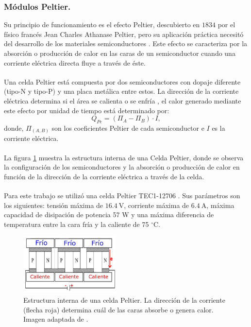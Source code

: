 \subsubsection{Módulos Peltier.}
Su principio de funcionamiento es el efecto Peltier, descubierto en $1834$ por el físico francés Jean Charles Athanase Peltier, pero su aplicación práctica necesitó del desarrollo de los materiales semiconductores \citep{Sandoval2007}. Este efecto se caracteriza por la absorción o producción de calor en las caras de un semiconductor cuando una corriente eléctrica directa fluye a través de éste. \\ \\
Una celda Peltier está compuesta por  dos semiconductores con dopaje diferente (tipo-N y tipo-P) y una placa metálica entre estos. La dirección de la corriente eléctrica determina si el área se calienta o se enfría \citep{peltier_theory}, el calor generado mediante este efecto por unidad de tiempo está determinado por:
\begin{equation}
Q_{Pe}=(\Pi_{A}-\Pi_{B})\cdot I,
\label{peltier_eq}
\end{equation}
donde, $\Pi_{(A,B)}$ son los coeficientes Peltier de cada semiconductor e $I$ es la corriente eléctrica.\\ \\
La figura \ref{fig:celda} muestra la estructura interna de una Celda Peltier, donde se observa la configuración de los semiconductores y la absorción o producción de calor en función de la dirección de la corriente eléctrica a través de la celda.\\ \\
Para este trabajo se utilizó una celda Peltier TEC1-12706 \citep{datasheet_Peltier}. Sus parámetros son los siguientes: tensión máxima de $16.4~\mbox{V}$, corriente máxima de $6.4~\mbox{A}$, máxima capacidad de disipación de potencia 57 W y una máxima diferencia de temperatura entre la cara fría y la caliente de 75 $^\circ \mbox{C}$.

\begin{figure}[h!]
\begin{centering}
  \includegraphics[width=0.45\textwidth]{Images/celda.JPG}
    \caption{Estructura interna de una celda Peltier. La dirección de la corriente (flecha roja) determina cuál de las caras absorbe o genera calor. Imagen adaptada de \citep{tesis_caract_SIPM}.}
    \label{fig:celda}
  \par\end{centering}
\end{figure}

